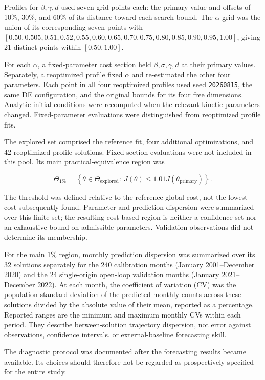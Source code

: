 \documentclass[pdflatex,sn-mathphys-ay]{sn-jnl}
\begin{document}
Profiles for $\beta,\gamma,d$ used seven grid points each: the primary value and offsets of 10\%, 30\%, and 60\% of its distance toward each search bound. The $\alpha$ grid was the union of its corresponding seven points with $[0.50,0.505,0.51,0.52,0.55,0.60,0.65,0.70,0.75,0.80,0.85,0.90,0.95,1.00]$, giving 21 distinct points within $[0.50,1.00]$.

For each $\alpha$, a fixed-parameter cost section held $\beta,\sigma,\gamma,d$ at their primary values. Separately, a reoptimized profile fixed $\alpha$ and re-estimated the other four parameters. Each point in all four reoptimized profiles used seed \texttt{20260815}, the same DE configuration, and the original bounds for its four free dimensions. Analytic initial conditions were recomputed when the relevant kinetic parameters changed. Fixed-parameter evaluations were distinguished from reoptimized profile fits.

The explored set comprised the reference fit, four additional optimizations, and 42 reoptimized profile solutions. Fixed-section evaluations were not included in this pool. Its main practical-equivalence region was

\[
\Theta_{1\%}=\left\{\theta\in\Theta_{\mathrm{explored}}:\ J(\theta)\le1.01J(\theta_{\mathrm{primary}})\right\}.
\]

The threshold was defined relative to the reference global cost, not the lowest cost subsequently found. Parameter and prediction dispersion were summarized over this finite set; the resulting cost-based region is neither a confidence set nor an exhaustive bound on admissible parameters. Validation observations did not determine its membership.

For the main 1\% region, monthly prediction dispersion was summarized over its 32 solutions separately for the 240 calibration months (January 2001--December 2020) and the 24 single-origin open-loop validation months (January 2021--December 2022). At each month, the coefficient of variation (CV) was the population standard deviation of the predicted monthly counts across these solutions divided by the absolute value of their mean, reported as a percentage. Reported ranges are the minimum and maximum monthly CVs within each period. They describe between-solution trajectory dispersion, not error against observations, confidence intervals, or external-baseline forecasting skill.

The diagnostic protocol was documented after the forecasting results became available. Its choices should therefore not be regarded as prospectively specified for the entire study.
\end{document}
